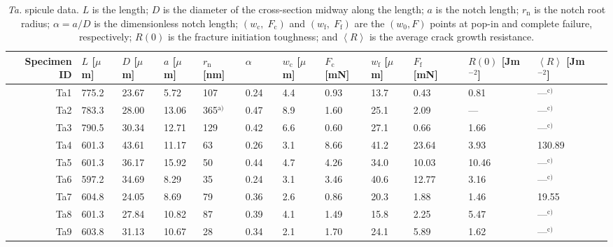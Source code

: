 \documentclass[12pt,onecolumn]{article}
\makeatletter
\newcommand{\TA}{\textit{Ta.\@}\xspace}
\newcommand{\ra}[1]{\renewcommand{\arraystretch}{#1}}
\makeatother
\begin{document}
\begin{bibunit}
\begin{table}
{\scriptsize
\centering
\caption{\TA spicule data. $L$ is the length; $D$ is the diameter of the cross-section midway along the length; $a$ is the notch length; $r_\mathrm{n}$ is the notch root radius; $\alpha=a/D$ is the dimensionless notch length; $(w_\mathrm{c},\;F_\mathrm{c})$ and $(w_\mathrm{f},\;F_\mathrm{f})$ are the $(w_0,F)$ points at pop-in and complete failure, respectively; $R(0)$ is the fracture initiation toughness; and $\left< R \right>$ is the average crack growth resistance.}
\label{tab:TAdata}
\ra{1.25}
\begin{threeparttable}
\begin{tabular}{rllllllllllllll}
\toprule
Specimen ID & $L$ [$\mu$m] & $D$ [$\mu$m] & $a$ [$\mu$m] & $r_\mathrm{n}$ [nm] & $\alpha$ & & $w_\mathrm{c}$ [$\mu$m] & $F_\mathrm{c}$ [mN] & $w_\mathrm{f}$ [$\mu$m] & $F_\mathrm{f}$ [mN] & & $R(0)$ [Jm$^{-2}$] & $\left< R \right>$ [Jm$^{-2}$] \\
\midrule
Ta1 & 775.2 & 23.67 & 5.72 &  107 & 0.24 &  &  4.4 & 0.93 & 13.7 & 0.43 &  & 0.81 &---$^\text{c)}$\\ 
Ta2 & 783.3 & 28.00 & 13.06 &  365$^\text{a)}$ & 0.47 &  &  8.9 & 1.60 & 25.1 & 2.09 &  & --- &---$^\text{c)}$\\ 
Ta3 & 790.5 & 30.34 & 12.71 &  129 & 0.42 &  &  6.6 & 0.60 & 27.1 & 0.66 &  & 1.66 &---$^\text{c)}$\\ 
Ta4 & 601.3 & 43.61 & 11.17 &   63 & 0.26 &  &  3.1 & 8.66 & 41.2 & 23.64 &  & 3.93 &130.89 \\ 
Ta5 & 601.3 & 36.17 & 15.92 &   50 & 0.44 &  &  4.7 & 4.26 & 34.0 & 10.03 &  & 10.46 &---$^\text{c)}$\\ 
Ta6 & 597.2 & 34.69 & 8.29 &   35 & 0.24 &  &  3.1 & 3.46 & 40.6 & 12.77 &  & 3.16 &---$^\text{c)}$\\ 
Ta7 & 604.8 & 24.05 & 8.69 &   79 & 0.36 &  &  2.6 & 0.86 & 20.3 & 1.88 &  & 1.46 &19.55 \\ 
Ta8 & 601.3 & 27.84 & 10.82 &   87 & 0.39 &  &  4.1 & 1.49 & 15.8 & 2.25 &  & 5.47 &---$^\text{c)}$\\ 
Ta9 & 603.8 & 31.13 & 10.67 &   28 & 0.34 &  &  2.1 & 1.70 & 24.1 & 5.89 &  & 1.62 &---$^\text{c)}$\\ 

\end{tabular}
\end{threeparttable}}
\end{table}
\end{bibunit}
\end{document}

